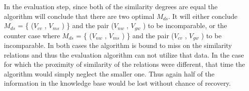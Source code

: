 In the evaluation step, since both of the similarity degrees are equal the algorithm will conclude that there are two optimal \textit{$M_{ds}$}. It will either conclude \textit{$M_{ds}$} \linebreak = \{ (\textit{$V_{cv }$} , \textit{$V_{ms}$} )  \} and the pair (\textit{$V_{nw }$} , \textit{$V_{gw}$} ) to be incomparable, or the counter case where \textit{$M_{ds}$} = \{ (\textit{$V_{nw }$} , \textit{$V_{ms}$} )  \} and the pair (\textit{$V_{cv }$} , \textit{$V_{gw}$} ) to be incomparable. In both cases the algorithm is bound to miss on the similarity relations and thus the evaluation algorithm can not utilize that data.
\newpage
In the case for which the proximity of similarity of the relations were different, that time the algorithm would simply neglect the smaller one. Thus again half of the information in the knowledge base would be lost without chance of recovery.


